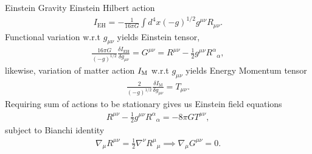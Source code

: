 \documentclass[8pt]{beamer}
\begin{document}

\begin{frame}{Einstein Gravity}
	Einstein Hilbert action
	\begin{eqnarray*}
	I_{\text{EH}} = -\frac{1}{16\pi G} \int d^4x (-g)^{1/2}  g^{\mu\nu}R_{\mu\nu}.
	\end{eqnarray*}
	Functional variation w.r.t $g_{\mu\nu}$ yields Einstein tensor,
	\begin{eqnarray*}
	\frac{16\pi G}{(-g)^{1/2}} \frac{\delta I_{\text{EH}}}{\delta g_{\mu\nu}}= G^{\mu\nu} = R^{\mu\nu} - \frac{1}{2}g^{\mu\nu}R^\alpha{}_\alpha,
	\end{eqnarray*}
	likewise, variation of matter action $I_{\rm M}$ w.r.t $g_{\mu\nu}$ yields Energy Momentum tensor
	\begin{eqnarray*}
	\frac{2}{(-g)^{1/2}} \frac{ \delta I_\text{M}}{\delta g_{\mu\nu}} = T_{\mu\nu}. 
	\end{eqnarray*}
	Requiring sum of actions to be stationary gives us Einstein field equations
	\begin{eqnarray*}
	R^{\mu\nu} - \frac{1}{2}g^{\mu\nu}R^\alpha{}_\alpha = -8\pi G T^{\mu\nu},
	\label{EinEOM}
	\end{eqnarray*}
	subject to Bianchi identity
	\begin{eqnarray*}
	\nabla_\mu R^{\mu\nu} = \frac{1}{2}\nabla^\nu R^\mu{}_\mu \implies \nabla_\mu G^{\mu\nu} = 0.
	\end{eqnarray*}
\end{frame}

\end{document}
